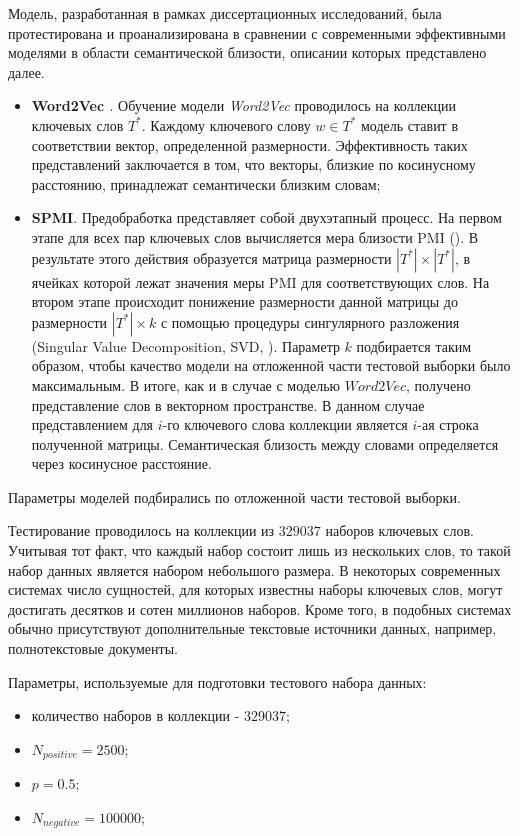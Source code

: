 Модель, разработанная в рамках диссертационных исследований, была протестирована и проанализирована в сравнении с современными эффективными  моделями в области семантической близости, описании которых представлено далее.

\begin{itemize}
    \item \textbf{Word2Vec \cite{word2vec}}. Обучение модели \emph{Word2Vec} проводилось на коллекции ключевых слов $T^*$. Каждому ключевого слову $w \in T^*$ модель ставит в соответствии вектор, определенной размерности. Эффективность таких представлений заключается в том, что векторы, близкие по косинусному расстоянию, принадлежат семантически близким словам;
    \item \textbf{SPMI\cite{spmi}}. Предобработка представляет собой двухэтапный процесс. На первом этапе для всех пар ключевых слов вычисляется мера близости PMI (\cite{pmi}). В результате этого действия образуется матрица размерности $|T^*| \times |T^*|$, в ячейках которой лежат значения меры PMI для соответствующих слов. На втором этапе происходит понижение размерности данной матрицы до размерности $|T^*| \times k $ с помощью процедуры сингулярного разложения (Singular Value Decomposition, SVD, \cite{svd}). Параметр $k$ подбирается таким образом, чтобы качество модели на отложенной части тестовой выборки было максимальным. В итоге, как и в случае с моделью $Word2Vec$, получено представление слов в векторном пространстве. В данном случае представлением для $i$-го ключевого слова коллекции является $i$-ая строка полученной матрицы. Семантическая близость между словами определяется через косинусное расстояние.
\end{itemize}

Параметры моделей подбирались по отложенной части тестовой выборки.

Тестирование проводилось на коллекции из $329037$ наборов ключевых слов. Учитывая тот факт, что каждый набор состоит лишь из нескольких слов, то такой набор данных является набором небольшого размера. В некоторых современных системах число сущностей, для которых известны наборы ключевых слов, могут достигать десятков и сотен миллионов наборов. Кроме того, в подобных системах обычно присутствуют дополнительные текстовые источники данных, например, полнотекстовые документы.

Параметры, используемые для подготовки тестового набора данных:
\begin{itemize}
    \item количество наборов в коллекции - $329037$;
    \item $N_{positive} = 2500$;
    \item $p = 0.5$;
    \item $N_{negative} = 100000$;
\end{itemize}

